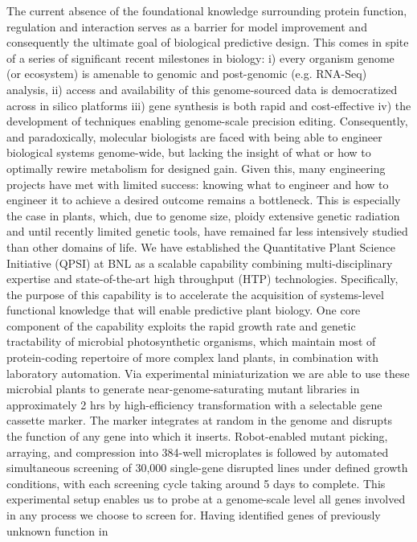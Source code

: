 \documentclass[11pt]{article}
\begin{document}
The current absence of the foundational knowledge surrounding protein
function, regulation and interaction serves as a barrier for model
improvement and consequently the ultimate goal of biological
predictive design. This comes in spite of a series of significant
recent milestones in biology: i) every organism genome (or ecosystem)
is amenable to genomic and post-genomic (e.g. RNA-Seq) analysis, ii)
access and availability of this genome-sourced data is democratized
across in silico platforms iii) gene synthesis is both rapid and
cost-effective iv) the development of techniques enabling genome-scale
precision editing. Consequently, and paradoxically, molecular
biologists are faced with being able to engineer biological systems
genome-wide, but lacking the insight of what or how to optimally
rewire metabolism for designed gain. Given this, many engineering
projects have met with limited success: knowing what to engineer and
how to engineer it to achieve a desired outcome remains a
bottleneck. This is especially the case in plants, which, due to
genome size, ploidy extensive genetic radiation and until recently
limited genetic tools, have remained far less intensively studied than
other domains of life.  We have established the Quantitative Plant
Science Initiative (QPSI) at BNL as a scalable capability combining
multi-disciplinary expertise and state-of-the-art high throughput
(HTP) technologies. Specifically, the purpose of this capability is to
accelerate the acquisition of systems-level functional knowledge that
will enable predictive plant biology. One core component of the
capability exploits the rapid growth rate and genetic tractability of
microbial photosynthetic organisms, which maintain most of
protein-coding repertoire of more complex land plants, in combination
with laboratory automation. Via experimental miniaturization we are
able to use these microbial plants to generate near-genome-saturating
mutant libraries in approximately 2 hrs by high-efficiency
transformation with a selectable gene cassette marker. The marker
integrates at random in the genome and disrupts the function of any
gene into which it inserts. Robot-enabled mutant picking, arraying,
and compression into 384-well microplates is followed by automated
simultaneous screening of 30,000 single-gene disrupted lines under
defined growth conditions, with each screening cycle taking around 5
days to complete. This experimental setup enables us to probe at a
genome-scale level all genes involved in any process we choose to
screen for.  Having identified genes of previously unknown function in
\end{document}
